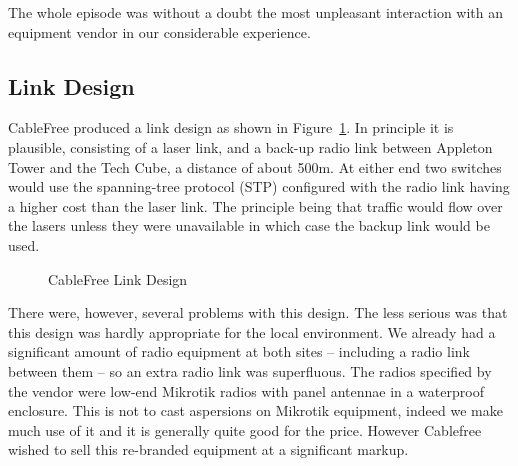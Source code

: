 The whole episode was without a doubt the most unpleasant interaction
with an equipment vendor in our considerable experience.

\subsection{Link Design}
\label{sec:link-design}

CableFree produced a link design as shown in
Figure~\ref{fig:cablefree-link}. In principle it is plausible,
consisting of a laser link, and a back-up radio link between Appleton
Tower and the Tech Cube, a distance of about 500m. At either end two
switches would use the spanning-tree protocol (STP) configured with the
radio link having a higher cost than the laser link. The principle
being that traffic would flow over the lasers unless they were
unavailable in which case the backup link would be used.
\def\cfdesign{%
    \node[draw,rotate=90] (atnetgear) at (0,0) {Netgear Switch};
    \node[draw] (atlaser) at (2,1) {Laser};
    \node[draw] (atradio) at (2,-1) {Radio};
    \node[draw] (tclaser) at (6,1) {Laser};
    \node[draw] (tcradio) at (6,-1) {Radio};
    \node[draw,rotate=-90] (tcnetgear) at (8,0) {Netgear Switch};
    \draw[thick,blue] (-1,0) edge (atnetgear.north);
    \draw[thick,blue] (9,0) edge (tcnetgear.north);
    \draw[thick,orange] (atnetgear.south) edge (atlaser.west);
    \draw[thick,orange] (tcnetgear.south) edge (tclaser.east);
    \draw[thick,blue] (atnetgear.south) edge (atradio.west);
    \draw[thick,blue] (tcnetgear.south) edge (tcradio.east);
    \draw[thick,red,dotted] (atlaser.east) edge (tclaser.west);
    \draw[thick,black,dotted] (atradio.east) edge (tcradio.west);
    \node at(4,0) {$\approx 500\text{m}$};
    \node at(4,1.5) {$\text{cost} = 1000$};
    \node at(4,-1.5) {$\text{cost} = 100000$};
}
\begin{figure}[h]
  \centering
  \caption{CableFree Link Design}
  \label{fig:cablefree-link}
\end{figure}

There were, however, several problems with this design. The less
serious was that this design was hardly appropriate for the local
environment. We already had a significant amount of radio equipment at
both sites -- including a radio link between them -- so an extra radio
link was superfluous. The radios specified by the vendor were low-end
Mikrotik radios with panel antennae in a waterproof enclosure. This is
not to cast aspersions on Mikrotik equipment, indeed we make much use
of it and it is generally quite good for the price. However Cablefree
wished to sell this re-branded equipment at a significant markup.

